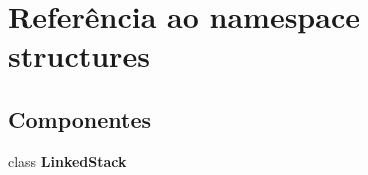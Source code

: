 \section{Referência ao namespace structures}
\label{namespacestructures}
\subsection*{Componentes}
\begin{DoxyCompactItemize}
\item 
class \textbf{ Linked\+Stack}
\end{DoxyCompactItemize}
